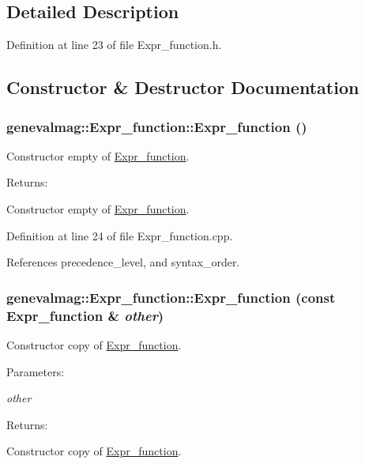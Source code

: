 \subsection{Detailed Description}


Definition at line 23 of file Expr\_\-function.h.

\subsection{Constructor \& Destructor Documentation}
\hypertarget{classgenevalmag_1_1Expr__function_11842df1439746a952704518f5e1df1e}{
\subsubsection[{Expr\_\-function}]{\setlength{\rightskip}{0pt plus 5cm}genevalmag::Expr\_\-function::Expr\_\-function ()}}
\label{classgenevalmag_1_1Expr__function_11842df1439746a952704518f5e1df1e}


Constructor empty of \hyperlink{classgenevalmag_1_1Expr__function}{Expr\_\-function}. \begin{Desc}
\item[Returns:]\end{Desc}
Constructor empty of \hyperlink{classgenevalmag_1_1Expr__function}{Expr\_\-function}. 

Definition at line 24 of file Expr\_\-function.cpp.

References precedence\_\-level, and syntax\_\-order.\hypertarget{classgenevalmag_1_1Expr__function_2e4a1518e004d243a209e5c9ca0e54b4}{
\subsubsection[{Expr\_\-function}]{\setlength{\rightskip}{0pt plus 5cm}genevalmag::Expr\_\-function::Expr\_\-function (const {\bf Expr\_\-function} \& {\em other})}}
\label{classgenevalmag_1_1Expr__function_2e4a1518e004d243a209e5c9ca0e54b4}


Constructor copy of \hyperlink{classgenevalmag_1_1Expr__function}{Expr\_\-function}. \begin{Desc}
\item[Parameters:]
\begin{description}
\item[{\em other}]\end{description}
\end{Desc}
\begin{Desc}
\item[Returns:]\end{Desc}
Constructor copy of \hyperlink{classgenevalmag_1_1Expr__function}{Expr\_\-function}. 

